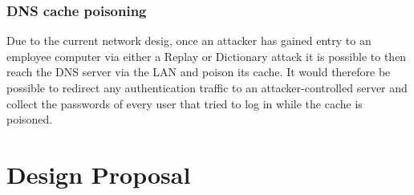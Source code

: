 \documentclass[11pt]{article}
\begin{document}
      \subsubsection{DNS cache poisoning}
        Due to the current network desig, once an attacker has gained entry to an employee computer via either a Replay or Dictionary attack it is possible to then reach the DNS server via the LAN and poison its cache. It would therefore be possible to redirect any authentication traffic to an attacker-controlled server and collect the passwords of every user that tried to log in while the cache is poisoned.

    \section{Design Proposal}




  \newpage

  
  
\end{document}
